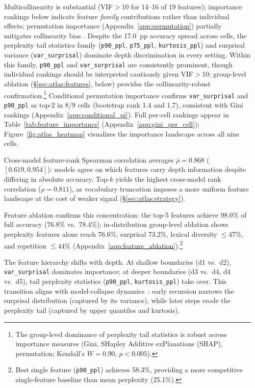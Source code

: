 Multicollinearity is substantial (VIF${>}$10 for 14--16 of 19 features); importance rankings below indicate feature \emph{family} contributions rather than individual effects; permutation importance (Appendix~\ref{app:permutation}) partially mitigates collinearity bias \cite{strobl2008_conditional,hooker2021_permutation}.
Despite the 17.0~pp accuracy spread across cells, the perplexity tail statistics family (\texttt{p90\_ppl}, \texttt{p75\_ppl}, \texttt{kurtosis\_ppl}) and surprisal variance (\texttt{var\_surprisal}) dominate depth discrimination in every setting.
Within this family, \texttt{p90\_ppl} and \texttt{var\_surprisal} are consistently prominent, though individual rankings should be interpreted cautiously given VIF${>}$10; group-level ablation (\S\ref{sec:atlas:features}, below) provides the collinearity-robust confirmation.\footnote{The group-level dominance of perplexity tail statistics is robust across importance measures (Gini, SHapley Additive exPlanations (SHAP), permutation; Kendall's $W{=}0.90$, $p{<}0.005$).}
Conditional permutation importance \citep{strobl2008_conditional} confirms \texttt{var\_surprisal} and \texttt{p90\_ppl} as top-2 in 8/9 cells (bootstrap rank 1.4 and 1.7), consistent with Gini rankings (Appendix~\ref{app:conditional_pi}).
Full per-cell rankings appear in Table~\ref{tab:feature_importance} (Appendix~\ref{app:gini_per_cell}); Figure~\ref{fig:atlas_heatmap} visualizes the importance landscape across all nine cells.

Cross-model feature-rank Spearman correlation averages $\bar{\rho} = 0.868$ ($[0.619, 0.954]$): models agree on which features carry depth information despite differing in absolute accuracy.
Top-$k$ yields the highest cross-model rank correlation ($\rho = 0.811$), as vocabulary truncation imposes a more uniform feature landscape at the cost of weaker signal (\S\ref{sec:atlas:strategy}).

Feature ablation confirms this concentration: the top-5 features achieve 98.0\% of full accuracy (76.8\% vs.\ 78.4\%); in-distribution group-level ablation shows perplexity features alone reach 76.6\%, surprisal 73.2\%, lexical diversity ${\leq}$47\%, and repetition ${\leq}$44\% (Appendix~\ref{app:feature_ablation}).\footnote{Best single feature (\texttt{p90\_ppl}) achieves 58.3\%, providing a more competitive single-feature baseline than mean perplexity (25.1\%).}

The feature hierarchy shifts with depth.
At shallow boundaries (d1 vs.\ d2), \texttt{var\_surprisal} dominates importance; at deeper boundaries (d3 vs.\ d4, d4 vs.\ d5), tail perplexity statistics (\texttt{p90\_ppl}, \texttt{kurtosis\_ppl}) take over.
This transition aligns with model-collapse dynamics~\cite{shumailov2024_nature}: early recursion narrows the surprisal distribution (captured by its variance), while later steps erode the perplexity tail (captured by upper quantiles and kurtosis).


